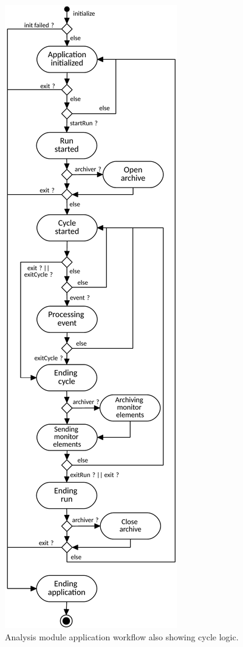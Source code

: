 \documentclass[conference]{IEEEtran}
\begin{document}
\begin{figure}[htbp]
  \begin{center}
    \includegraphics[width=0.65\linewidth]{figs/AnalysisModuleApplicatonWorkflowDiagram.pdf}
    \caption{\label{fig:DQMCycleSystem} Analysis module application workflow also showing cycle logic.}
  \end{center}
\end{figure}
\end{document}
